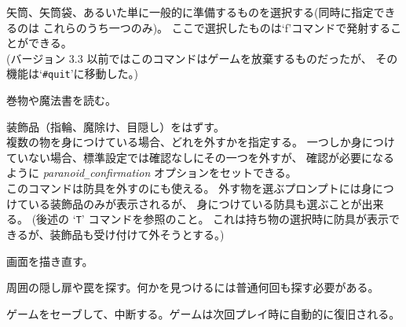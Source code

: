 矢筒、矢筒袋、あるいた単に一般的に準備するものを選択する(同時に指定できるのは
これらのうち一つのみ)。
ここで選択したものは`f'コマンドで発射することができる。\\
(バージョン 3.3 以前ではこのコマンドはゲームを放棄するものだったが、
その機能は`{\tt \#quit}'に移動した。)
\item[\tb{r}]
巻物や魔法書を読む。
\item[\tb{R}]
装飾品（指輪、魔除け、目隠し）をはずす。\\
複数の物を身につけている場合、どれを外すかを指定する。
一つしか身につけていない場合、標準設定では確認なしにその一つを外すが、
確認が必要になるように
{\it paranoid\verb+_+confirmation\/}
オプションをセットできる。\\
このコマンドは防具を外すのにも使える。
外す物を選ぶプロンプトには身につけている装飾品のみが表示されるが、
身につけている防具も選ぶことが出来る。
(後述の `{\tt T}' コマンドを参照のこと。
これは持ち物の選択時に防具が表示できるが、装飾品も受け付けて外そうとする。)
\item[\tb{\^{}R}]
画面を描き直す。
\item[\tb{s}]
周囲の隠し扉や罠を探す。何かを見つけるには普通何回も探す必要がある。
\item[\tb{S}]
ゲームをセーブして、中断する。ゲームは次回プレイ時に自動的に復旧される。
\item[\tb{t}]
